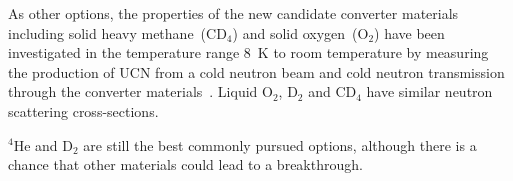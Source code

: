 As other options, the properties of the new candidate converter
materials including solid heavy methane~(CD$_4$) and solid
oxygen~(O$_2$) have been investigated in the temperature range 8~K to
room temperature by measuring the production of UCN from a cold
neutron beam and cold neutron transmission through the converter
materials~\cite{Atchison2009}. Liquid O$_2$, D$_2$ and CD$_4$ have
similar neutron scattering cross-sections.

$^4$He and D$_2$ are still the best commonly pursued options, although
there is a chance that other materials could lead to a breakthrough.













